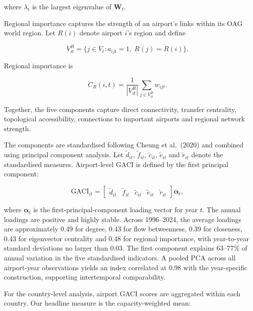 \documentclass[12pt]{article}
\begin{document}
where $\lambda_t$ is the largest eigenvalue of $\mathbf W_t$.

Regional importance captures the strength of an airport's links within its OAG world region. Let $R(i)$ denote airport $i$'s region and define

\begin{equation}
V_{it}^{R}
=
\{j\in V_t:a_{ijt}=1,\;R(j)=R(i)\}.
\label{eq:nature_18}
\end{equation}

Regional importance is

\begin{equation}
C_R(i,t)
=
\frac{1}{|V_{it}^{R}|}
\sum_{j\in V_{it}^{R}}w_{ijt}.
\label{eq:nature_19}
\end{equation}

Together, the five components capture direct connectivity, transfer centrality, topological accessibility, connections to important airports and regional network strength.

The components are standardised following Cheung et al.\ (2020) and combined using principal component analysis. Let $\widetilde d_{it}$, $\widetilde f_{it}$, $\widetilde c_{it}$, $\widetilde e_{it}$ and $\widetilde r_{it}$ denote the standardised measures. Airport-level GACI is defined by the first principal component:

\begin{equation}
\mathrm{GACI}_{it}
=
\begin{bmatrix}
\widetilde d_{it}&
\widetilde f_{it}&
\widetilde c_{it}&
\widetilde e_{it}&
\widetilde r_{it}
\end{bmatrix}
\boldsymbol{\alpha}_t,
\label{eq:nature_20}
\end{equation}

where $\boldsymbol{\alpha}_t$ is the first-principal-component loading vector for year $t$. The annual loadings are positive and highly stable. Across 1996--2024, the average loadings are approximately 0.49 for degree, 0.43 for flow betweenness, 0.39 for closeness, 0.43 for eigenvector centrality and 0.48 for regional importance, with year-to-year standard deviations no larger than 0.03. The first component explains 63--77\% of annual variation in the five standardised indicators. A pooled PCA across all airport-year observations yields an index correlated at 0.98 with the year-specific construction, supporting intertemporal comparability.

For the country-level analysis, airport GACI scores are aggregated within each country. Our headline measure is the capacity-weighted mean:
\end{document}
